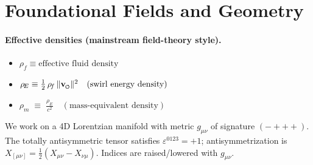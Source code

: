 \documentclass[smallextended]{svjour3}       %
\newcommand{\swirlarrow}{%
	\mathchoice{\mkern-2mu\scriptstyle\boldsymbol{\circlearrowleft}}%
	{\mkern-2mu\scriptstyle\boldsymbol{\circlearrowleft}}%
	{\mkern-2mu\scriptscriptstyle\boldsymbol{\circlearrowleft}}%
	{\mkern-2mu\scriptscriptstyle\boldsymbol{\circlearrowleft}}%
}
\newcommand{\vswirl}{\mathbf{v}_{\swirlarrow}}
\newcommand{\vnorm}{\lVert \vswirl \rVert} %
\newcommand{\rhoF}{\rho_{\!f}}      %
\newcommand{\rhoE}{\rho_{\!E}}      %
\newcommand{\rhoM}{\rho_{\!m}}      %
\begin{document}
	\section{Foundational Fields and Geometry}
	\paragraph{Effective densities (mainstream field-theory style).}
	\begin{itemize}
		\item $\rhoF \equiv \text{effective fluid density}$
		\item $\rhoE \equiv \tfrac12\,\rhoF\,\vnorm^{2}\quad(\text{swirl energy density})$
        \item $\rhoM \;\equiv\; \frac{\rhoE}{c^2}\quad(\text{mass-equivalent density})$
	\end{itemize}


	We work on a 4D Lorentzian manifold with metric \(g_{\mu\nu}\) of signature \((-+++)\). The totally antisymmetric tensor satisfies \(\varepsilon^{0123}=+1\); antisymmetrization is \(X_{[\mu\nu]}=\tfrac12(X_{\mu\nu}-X_{\nu\mu})\). Indices are raised/lowered with \(g_{\mu\nu}\).
\end{document}
